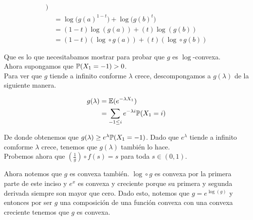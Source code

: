 \begin{align}
                                                \bigg)                                                                              \\
                                         &=      \log\bigg( 
                                                        g(a)^{1-t} 
                                                \bigg)
                                                        + 
                                                \log\bigg(
                                                        g(b)^{t}
                                                \bigg)                                                                              \\
                                         &=      (1-t)\log(g(a))+(t)\log(g(b))                                                      \\
                                         &=      (1-t)(\log \circ g (a))+(t)(\log \circ g (b))                                        
    \end{align}
    
    Que es lo que necesitabamos mostrar para probar que $g$ es $\log$-convexa.\\
    
    Ahora supongamos que $\mathbb{P}(X_1 = -1) > 0$.\\
    
    Para ver que $g$ tiende a infinito conforme $\lambda$ crece, descompongamos a $g(\lambda)$ de la siguiente manera.
    
    \begin{align}
        g(\lambda)      &=      \mathbb{E}(e^{-\lambda X_1})                \\
                        &=      \sum_{-1 \leq i} e^{-\lambda i} \mathbb{P}( X_1 = i)
    \end{align}
    
    De donde obtenemos que $g(\lambda) \geq e^{\lambda} \mathbb{P}( X_1 = -1)$. Dado que $e^{\lambda}$ tiende a infinito comforme
    $\lambda$ crece, tenemos que $g(\lambda)$ también lo hace.\\
    
    Probemos ahora que $(\frac{1}{g}) \circ f (s) = s$ para toda $s \in (0,1)$.
    
    Ahora notemos que $g$ es convexa también. $\log \circ g$ es convexa por la primera parte de este inciso y 
    $e^x$ es convexa y creciente porque su primera y segunda derivada siempre son mayor que cero. 
    Dado esto, notemos que $g = e^{\log(g)}$ y entonces por ser $g$ una composición de una función convexa con una
    convexa creciente tenemos que $g$ es convexa.\\
    
